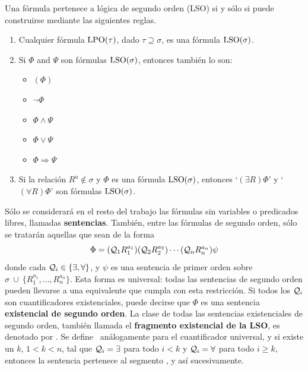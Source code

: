 \begin{definition} Una fórmula pertenece a lógica de segundo orden (LSO) si y
sólo si puede construirse mediante las siguientes reglas.
\label{lso_def}
\begin{enumerate}

\item Cualquier fórmula $\text{LPO}(\tau)$, dado $\tau\supseteq\sigma$, es una
fórmula $\text{LSO}(\sigma)$.
\item Si $\Phi$ and $\Psi$ son fórmulas $\text{LSO}(\sigma)$, entonces también lo
son:
 \begin{itemize}
    \item $(\Phi)$
    \item $\neg\Phi$
    \item $\Phi\land\Psi$
    \item $\Phi\lor\Psi$
    \item $\Phi\Rightarrow\Psi$
  \end{itemize}
\item Si la relación $R^a\notin\sigma$ y $\Phi$ es una fórmula $\text{LSO}(\sigma)$,
  entonces `$(\exists R)\Phi$' y `$(\forall R)\Phi$' son fórmulas $\text{LSO}(\sigma)$.
\end{enumerate}
\end{definition}

Sólo se considerará en el resto del trabajo las fórmulas sin variables o
predicados libres,
llamadas \textbf{sentencias}.
También, entre las fórmulas de segundo orden, sólo se tratarán aquellas que
sean de la forma
\[ \Phi = (\mathcal{Q}_1R_1^{a_1})(\mathcal{Q}_2R_2^{a_2})\cdots(\mathcal{Q}_nR_n^{a_n})\psi \]
donde cada $\mathcal{Q}_i \in \{\exists,\forall\}$, y
$\psi$ es una sentencia de primer orden sobre $\sigma\ \cup\ \{R_1^{a_1},\ldots,R_n^{a_n}\}$.
Esta forma es universal: todas las sentencias de segundo orden pueden llevarse
a una equivalente que cumpla con esta restricción.
Si todos los $\mathcal{Q}_i$ son cuantificadores existenciales, puede decirse que
$\Phi$ es una sentencia \textbf{existencial de segundo orden}.
La clase de todas las sentencias existenciales de segundo orden, también
llamada el \textbf{fragmento existencial de la LSO}, es denotado por \SOE. Se
define \SOA\ análogamente para el cuantificador universal,
y si existe un $k$, $1<k<n$, tal que $\mathcal{Q}_i=\exists$ para todo $i<k$
y $\mathcal{Q}_i=\forall$ para todo $i\geq k$, entonces la sentencia
pertenece al segmento \SOEA, y así sucesivamente.

